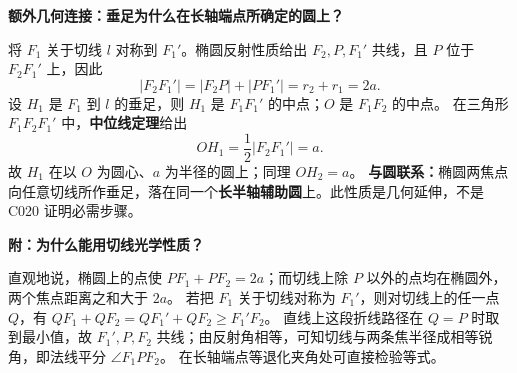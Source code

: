\begin{proofbox}
\medskip
\textbf{\textcolor{CProof}{额外几何连接：垂足为什么在长轴端点所确定的圆上？}}

将 $F_1$ 关于切线 $l$ 对称到 $F_1'$。椭圆反射性质给出 $F_2,P,F_1'$ 共线，且 $P$ 位于 $F_2F_1'$ 上，因此
\[
|F_2F_1'|=|F_2P|+|PF_1'|=r_2+r_1=2a.
\]
设 $H_1$ 是 $F_1$ 到 $l$ 的垂足，则 $H_1$ 是 $F_1F_1'$ 的中点；$O$ 是 $F_1F_2$ 的中点。
在三角形 $F_1F_2F_1'$ 中，\textbf{中位线定理}给出
\[
OH_1=\frac12|F_2F_1'|=a.
\]
故 $H_1$ 在以 $O$ 为圆心、$a$ 为半径的圆上；同理 $OH_2=a$。
\textbf{与圆联系：}椭圆两焦点向任意切线所作垂足，落在同一个\textbf{长半轴辅助圆}上。此性质是几何延伸，不是 C020 证明必需步骤。

\medskip
\textbf{\textcolor{CProof}{附：为什么能用切线光学性质？}}

直观地说，椭圆上的点使 $PF_1+PF_2=2a$；而切线上除 $P$ 以外的点均在椭圆外，两个焦点距离之和大于 $2a$。
若把 $F_1$ 关于切线对称为 $F_1'$，则对切线上的任一点 $Q$，有
$QF_1+QF_2=QF_1'+QF_2\ge F_1'F_2$。
直线上这段折线路径在 $Q=P$ 时取到最小值，故 $F_1',P,F_2$ 共线；由反射角相等，可知切线与两条焦半径成相等锐角，即法线平分 $\angle F_1PF_2$。
在长轴端点等退化夹角处可直接检验等式。
\end{proofbox}
